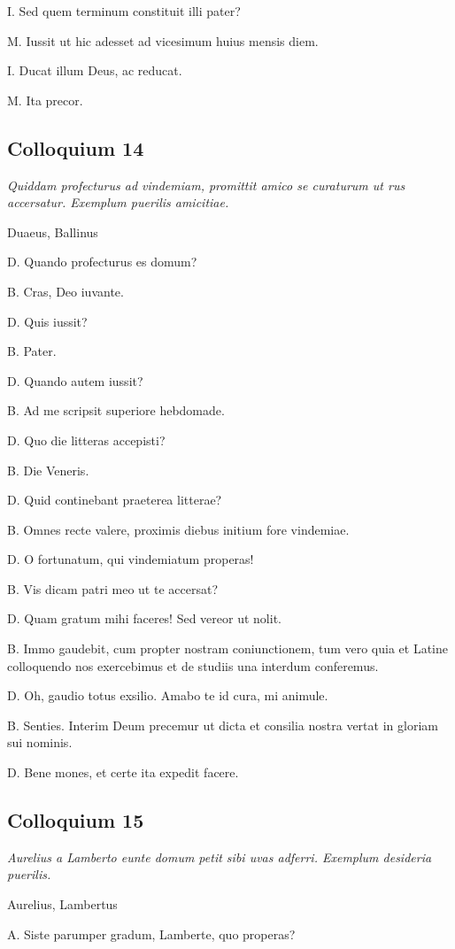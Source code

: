\documentclass{article}
\begin{document}
I. Sed quem terminum constituit illi pater?

M. Iussit ut hic adesset ad vicesimum huius mensis diem. 

I. Ducat illum Deus, ac reducat. 

M. Ita precor. 

\subsection{Colloquium 14}
\emph{Quiddam profecturus ad vindemiam, promittit amico se curaturum ut rus accersatur. Exemplum puerilis amicitiae.}

Duaeus, Ballinus

D. Quando profecturus es domum? 

B. Cras, Deo iuvante.

D. Quis iussit? 

B. Pater.

D. Quando autem iussit?

B. Ad me scripsit superiore hebdomade. 

D. Quo die litteras accepisti?

B. Die Veneris. 

D. Quid continebant praeterea litterae?

B. Omnes recte valere, proximis diebus initium fore vindemiae. 

D. O fortunatum, qui vindemiatum properas!

B. Vis dicam patri meo ut te accersat?

D. Quam gratum mihi faceres! Sed vereor ut nolit. 

B. Immo gaudebit, cum propter nostram coniunctionem, tum vero quia et Latine colloquendo nos exercebimus et de studiis una interdum conferemus. 

D. Oh, gaudio totus exsilio. Amabo te id cura, mi animule. 

B. Senties. Interim Deum precemur ut dicta et consilia nostra vertat in gloriam sui nominis.

D. Bene mones, et certe ita expedit facere. 

\subsection{Colloquium 15}
\emph{Aurelius a Lamberto eunte domum petit sibi uvas adferri. Exemplum desideria puerilis.}

Aurelius, Lambertus

A. Siste parumper gradum, Lamberte, quo properas?
\end{document}
